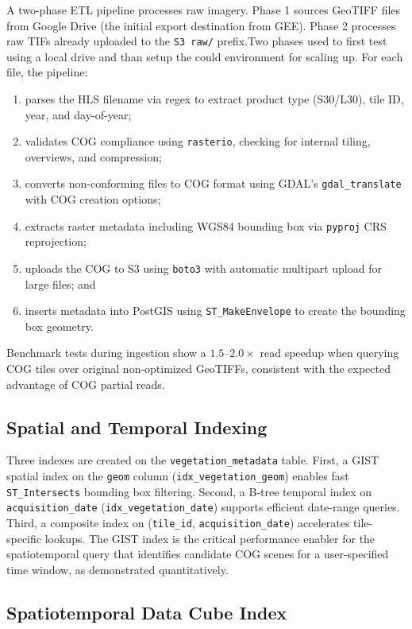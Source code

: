 A two-phase ETL pipeline processes raw imagery. Phase 1 sources GeoTIFF files from Google Drive (the initial export destination from GEE). Phase 2 processes raw TIFs already uploaded to the \texttt{S3 raw/} prefix.Two phases used to first test using a local drive and than setup the could environment for scaling up. For each file, the pipeline:
\begin{enumerate}
    \item parses the HLS filename via regex to extract product type (S30/L30), tile ID, year, and day-of-year;
    \item validates COG compliance using \texttt{rasterio}, checking for internal tiling, overviews, and compression;
    \item converts non-conforming files to COG format using GDAL's \texttt{gdal\_translate} with COG creation options;
    \item extracts raster metadata including WGS84 bounding box via \texttt{pyproj} CRS reprojection;
    \item uploads the COG to S3 using \texttt{boto3} with automatic multipart upload for large files; and
    \item inserts metadata into PostGIS using \texttt{ST\_MakeEnvelope} to create the bounding box geometry.
\end{enumerate}

Benchmark tests during ingestion show a $1.5$--$2.0\times$ read speedup when querying COG tiles over original non-optimized GeoTIFFs, consistent with the expected advantage of COG partial reads.

\subsection{Spatial and Temporal Indexing}

Three indexes are created on the \texttt{vegetation\_metadata} table. First, a GIST spatial index on the \texttt{geom} column (\texttt{idx\_vegetation\_geom}) enables fast \texttt{ST\_Intersects} bounding box filtering. Second, a B-tree temporal index on \texttt{acquisition\_date} (\texttt{idx\_vegetation\_date}) supports efficient date-range queries. Third, a composite index on (\texttt{tile\_id}, \texttt{acquisition\_date}) accelerates tile-specific lookups. The GIST index is the critical performance enabler for the spatiotemporal query that identifies candidate COG scenes for a user-specified time window, as demonstrated quantitatively. 

\subsection{Spatiotemporal Data Cube Index}

